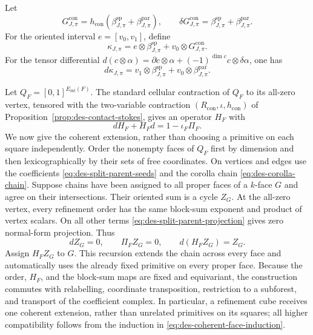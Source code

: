 Let
\begin{equation}
 G^{\mathrm{con}}_{J,\pi}
 =h_{\mathrm{con}}(\beta^{\mathrm{sp}}_{J,\pi}
                  +\beta^{\mathrm{par}}_{J,\pi}),\qquad
 \delta G^{\mathrm{con}}_{J,\pi}
 =\beta^{\mathrm{sp}}_{J,\pi}
  +\beta^{\mathrm{par}}_{J,\pi}.
 \label{eq:des-corolla-filler}
\end{equation}
For the oriented interval $e=[v_0,v_1]$, define
\begin{equation}
 \kappa_{J,\pi}
 =e\otimes\beta^{\mathrm{sp}}_{J,\pi}
  +v_0\otimes G^{\mathrm{con}}_{J,\pi}.
 \label{eq:des-corolla-chain}
\end{equation}
For the tensor differential
$d(c\otimes\alpha)=\partial c\otimes\alpha
+(-1)^{\dim c}c\otimes\delta\alpha$, one has
\begin{equation}
 d\kappa_{J,\pi}
 =v_1\otimes\beta^{\mathrm{sp}}_{J,\pi}
  +v_0\otimes\beta^{\mathrm{par}}_{J,\pi}.
 \label{eq:des-corolla-boundary}
\end{equation}

Let $Q_F=[0,1]^{E_{\mathrm{int}}(F)}$.  The standard cellular contraction of
$Q_F$ to its all-zero vertex, tensored with the two-variable contraction
$(R_{\mathrm{con}},\iota,h_{\mathrm{con}})$ of
Proposition~\ref{prop:des-contact-stokes}, gives an operator $H_F$ with
\begin{equation}
 dH_F+H_Fd=1-\iota_F\Pi_F.
 \label{eq:des-forest-contraction}
\end{equation}
We now give the coherent extension, rather than choosing a primitive on each
square independently.  Order the nonempty faces of $Q_F$ first by dimension
and then lexicographically by their sets of free coordinates.  On vertices
and edges use the coefficients \eqref{eq:des-split-parent-seeds} and the corolla chain
\eqref{eq:des-corolla-chain}.  Suppose chains have been assigned to all
proper faces of a $k$-face $G$ and agree on their intersections.  Their
oriented sum is a cycle $Z_G$.  At the all-zero vertex, every refinement
order has the same block-sum exponent and product of vertex scalars.  On all
other terms \eqref{eq:des-split-parent-projection} gives zero normal-form
projection.  Thus
\begin{equation}
 dZ_G=0,\qquad \Pi_FZ_G=0,\qquad d(H_FZ_G)=Z_G.
 \label{eq:des-coherent-face-induction}
\end{equation}
Assign $H_FZ_G$ to $G$.  This recursion extends the chain across every face
and automatically uses the already fixed primitive on every proper face.  Because the order,
$H_F$, and the block-sum maps are fixed and equivariant, the construction
commutes with relabelling, coordinate transposition, restriction to a
subforest, and transport of the coefficient complex.  In particular, a
refinement cube receives one coherent extension, rather than unrelated
primitives on its squares; all higher compatibility follows from the induction in
\eqref{eq:des-coherent-face-induction}.

